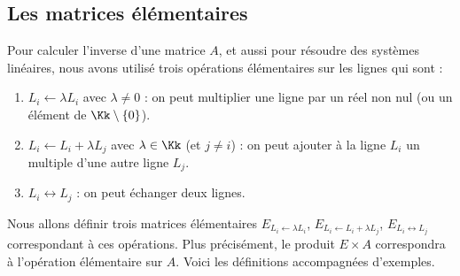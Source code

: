 \documentclass[class=report,crop=false]{standalone}
\begin{document}
\subsection{Les matrices élémentaires}

Pour calculer l'inverse d'une matrice $A$, et aussi pour résoudre des systèmes linéaires, nous avons utilisé trois opérations
 élémentaires sur les lignes qui sont :
\begin{enumerate}
  \item $L_i \leftarrow \lambda L_i$ avec $\lambda \neq 0$ :
  on peut multiplier une ligne par un réel non nul (ou un élément de $\Kk\setminus\{0\}$).

  \item $L_i \leftarrow L_i+\lambda L_j$ avec $\lambda \in \Kk$ (et $j\neq i$) :
  on peut ajouter à la ligne $L_i$ un multiple d'une autre ligne $L_j$.

  \item $L_i \leftrightarrow L_j$ : on peut échanger deux lignes.
\end{enumerate}

Nous allons définir trois matrices élémentaires
$E_{L_i \leftarrow \lambda L_i}$, $E_{L_i \leftarrow L_i+\lambda L_j}$,
$E_{L_i \leftrightarrow L_j}$
correspondant à ces opérations. Plus précisément, le produit $E\times A$ correspondra
à l'opération élémentaire sur $A$. Voici les définitions accompagnées d'exemples.
\end{document}
